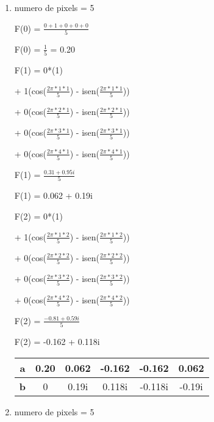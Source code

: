 \begin{question}

    \begin{enumerate}[label=\textbf{\alph*})]
        \item 
    
        numero de pixels = 5
    
      F(0) = $\frac{0 + 1 + 0 + 0 + 0}{5}$
    
      F(0) = $\frac{1}{5}$ = 0.20
    
      F(1) = 0*(1) 
    
      + 1(cos($\frac{2\pi*1*1}{5}$) - isen($\frac{2\pi*1*1}{5}$))
      
      + 0(cos($\frac{2\pi*2*1}{5}$) - isen($\frac{2\pi*2*1}{5}$))
    
      + 0(cos($\frac{2\pi*3*1}{5}$) - isen($\frac{2\pi*3*1}{5}$))
    
      + 0(cos($\frac{2\pi*4*1}{5}$) - isen($\frac{2\pi*4*1}{5}$)) 
    
      F(1) =  $\frac{0.31 + 0.95i}{5}$
    
      F(1) = 0.062 + 0.19i
    
      F(2) = 0*(1) 
    
      + 1(cos($\frac{2\pi*1*2}{5}$) - isen($\frac{2\pi*1*2}{5}$))
      
      + 0(cos($\frac{2\pi*2*2}{5}$) - isen($\frac{2\pi*2*2}{5}$))
    
      + 0(cos($\frac{2\pi*3*2}{5}$) - isen($\frac{2\pi*3*2}{5}$))
    
      + 0(cos($\frac{2\pi*4*2}{5}$) - isen($\frac{2\pi*4*2}{5}$)) 
    
      F(2) =  $\frac{-0.81 + 0.59i}{5}$
    
      F(2) = -0.162 + 0.118i
    
      \begin{table}[ht]
        \centering 
        \begin{tabular}{|c|c|c|c|c|c|}
            \hline
            \textbf{a} & 0.20 & 0.062 & -0.162 & -0.162 & 0.062 \\ 
            \hline
            \textbf{b} & 0 & 0.19i & 0.118i & -0.118i & -0.19i \\ 
            \hline
        \end{tabular}
      \end{table}
    
      \item 
    
      numero de pixels = 5
    

\end{enumerate}
\end{question}
